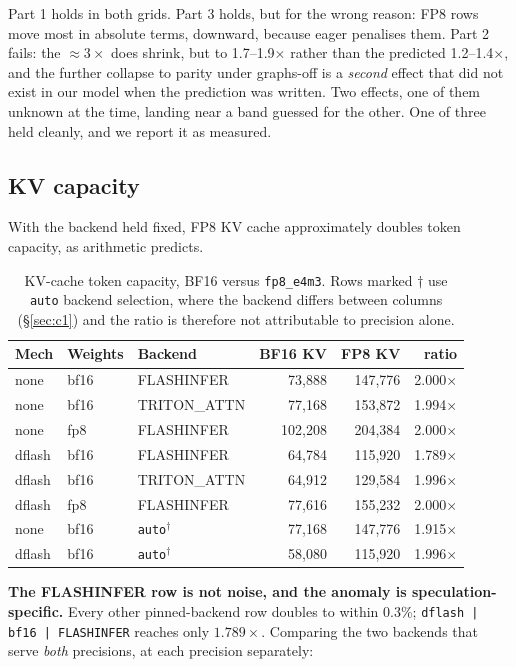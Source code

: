 \documentclass[11pt]{article}
\newcommand{\tw}[1]{\texttt{\small #1}}
\begin{document}
\noindent
Part 1 holds in both grids. Part 3 holds, but for the wrong reason: FP8 rows
move most in absolute terms, downward, because eager penalises them. Part 2
fails: the ${\approx}3\times$ does shrink, but to 1.7--1.9$\times$ rather than
the predicted 1.2--1.4$\times$, and the further collapse to parity under
graphs-off is a \emph{second} effect that did not exist in our model when the
prediction was written. Two effects, one of them unknown at the time, landing
near a band guessed for the other. One of three held cleanly, and we report
it as measured.

\subsection{KV capacity}

With the backend held fixed, FP8 KV cache approximately doubles token
capacity, as arithmetic predicts.

\begin{table}[h]\centering\small
\caption{KV-cache token capacity, BF16 versus \tw{fp8\_e4m3}. Rows marked
$\dagger$ use \tw{auto} backend selection, where the backend differs between
columns (\S\ref{sec:c1}) and the ratio is therefore not attributable to
precision alone.}
\begin{tabular}{lllrrr}
\toprule
Mech & Weights & Backend & BF16 KV & FP8 KV & ratio\\
\midrule
none & bf16 & FLASHINFER & 73{,}888 & 147{,}776 & 2.000$\times$\\
none & bf16 & TRITON\_ATTN & 77{,}168 & 153{,}872 & 1.994$\times$\\
none & fp8 & FLASHINFER & 102{,}208 & 204{,}384 & 2.000$\times$\\
dflash & bf16 & FLASHINFER & 64{,}784 & 115{,}920 & 1.789$\times$\\
dflash & bf16 & TRITON\_ATTN & 64{,}912 & 129{,}584 & 1.996$\times$\\
dflash & fp8 & FLASHINFER & 77{,}616 & 155{,}232 & 2.000$\times$\\
\midrule
none & bf16 & \tw{auto}$^\dagger$ & 77{,}168 & 147{,}776 & 1.915$\times$\\
dflash & bf16 & \tw{auto}$^\dagger$ & 58{,}080 & 115{,}920 & 1.996$\times$\\
\bottomrule
\end{tabular}
\end{table}

\noindent
\textbf{The FLASHINFER row is not noise, and the anomaly is
speculation-specific.} Every other pinned-backend row doubles to within
0.3\%; \tw{dflash\,|\,bf16\,|\,FLASHINFER} reaches only $1.789\times$.
Comparing the two backends that serve \emph{both} precisions, at each
precision separately:
\end{document}
